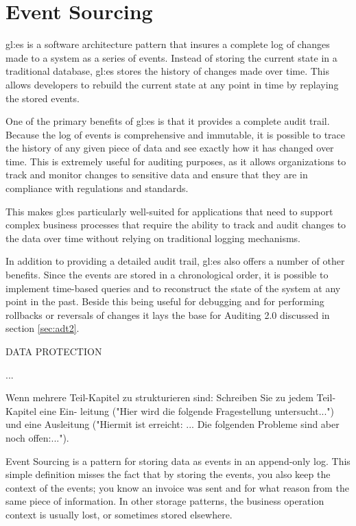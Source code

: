 %
\chapter{Event Sourcing}\label{chap:es}

\gls{gl:es} is a software architecture pattern that insures a complete log of changes made to a system as a series of events. Instead of storing the current state in a traditional database, \gls{gl:es} stores the history of changes made over time. This allows developers to rebuild the current state at any point in time by replaying the stored events.

One of the primary benefits of \gls{gl:es} is that it provides a complete audit trail. Because the log of events is comprehensive and immutable, it is possible to trace the history of any given piece of data and see exactly how it has changed over time. This is extremely useful for auditing purposes, as it allows organizations to track and monitor changes to sensitive data and ensure that they are in compliance with regulations and standards.

This makes \gls{gl:es} particularly well-suited for applications that need to support complex business processes that require the ability to track and audit changes to the data over time without relying on traditional logging mechanisms.

In addition to providing a detailed audit trail, \gls{gl:es} also offers a number of other benefits. Since the events are stored in a chronological order, it is possible to implement time-based queries and to reconstruct the state of the system at any point in the past. Beside this being useful for debugging and for performing rollbacks or reversals of changes it lays the base for Auditing 2.0 discussed in section \ref{sec:adt2}.

DATA PROTECTION

...\citep{fowler2022es}

Wenn mehrere Teil-Kapitel zu strukturieren sind: Schreiben Sie zu jedem Teil-Kapitel eine Ein- leitung ("Hier wird die folgende Fragestellung untersucht...") und eine Ausleitung ("Hiermit ist erreicht: ... Die folgenden Probleme sind aber noch offen:...").

Event Sourcing is a pattern for storing data as events in an append-only log. This simple definition misses the fact that by storing the events, you also keep the context of the events; you know an invoice was sent and for what reason from the same piece of information. In other storage patterns, the business operation context is usually lost, or sometimes stored elsewhere. %

